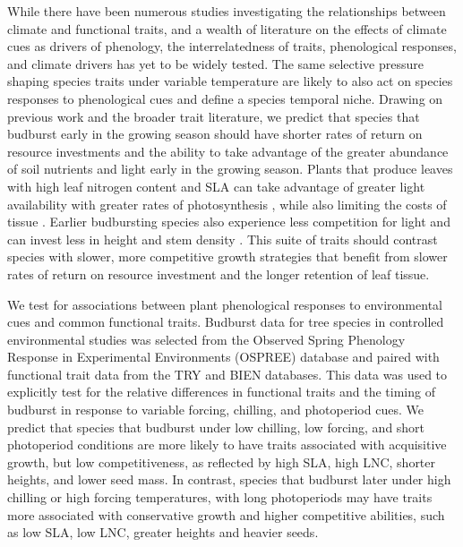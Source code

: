 \documentclass{article}\usepackage[]{graphicx}\usepackage[]{color}
\begin{document}
While there have been numerous studies investigating the relationships between climate and functional traits, and a wealth of literature on the effects of climate cues as drivers of phenology, the interrelatedness of traits, phenological responses, and climate drivers has yet to be widely tested. The same selective pressure shaping species traits under variable temperature are likely to also act on species responses to phenological cues and define a species temporal niche. Drawing on previous work and the broader trait literature, we predict that species that budburst early in the growing season should have shorter rates of return on resource investments and the ability to take advantage of the greater abundance of soil nutrients and light early in the growing season. Plants that produce leaves with high leaf nitrogen content and SLA can take advantage of greater light availability with greater rates of photosynthesis \citep{Wright2004,Pereira2020}, while also limiting the costs of tissue \citep{Lambers2004, Westoby2006, Herault2011}. Earlier budbursting species also experience less competition for light and can invest less in height and stem density \citep{Laughlin2010}. This suite of traits should contrast species with slower, more competitive growth strategies that benefit from slower rates of return on resource investment and the longer retention of leaf tissue. 

We test for associations between plant phenological responses to environmental cues and common functional traits. Budburst data for tree species in controlled environmental studies was selected from the Observed Spring Phenology Response in Experimental Environments (OSPREE) database and paired with functional trait data from the TRY and BIEN databases. This data was used to explicitly test for the relative differences in functional traits and the timing of budburst in response to variable forcing, chilling, and photoperiod cues. We predict that species that budburst under low chilling, low forcing, and short photoperiod conditions are more likely to have traits associated with acquisitive growth, but low competitiveness, as reflected by high SLA, high LNC, shorter heights, and lower seed mass. In contrast, species that budburst later under high chilling or high forcing temperatures, with long photoperiods  may have traits more associated with conservative growth and higher competitive abilities, such as low SLA, low LNC, greater heights and heavier seeds. 
\end{document}
